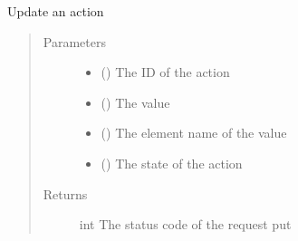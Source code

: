 \documentclass[letterpaper,10pt,english]{sphinxmanual}
\begin{document}
\begin{fulllineitems}
\begin{fulllineitems}
\label{\detokenize{index:Api.Api.update_action}}
\sphinxAtStartPar
Update an action
\begin{quote}\begin{description}
\item[{Parameters}] \leavevmode\begin{itemize}
\item {} 
\sphinxAtStartPar
{} () \textendash{} The ID of the action

\item {} 
\sphinxAtStartPar
{} () \textendash{} The value

\item {} 
\sphinxAtStartPar
{} () \textendash{} The element name of the value

\item {} 
\sphinxAtStartPar
{} () \textendash{} The state of the action

\end{itemize}

\item[{Returns}] \leavevmode
\sphinxAtStartPar
int \textendash{} The status code of the request put

\end{description}\end{quote}

\end{fulllineitems}



\end{fulllineitems}
\end{document}
